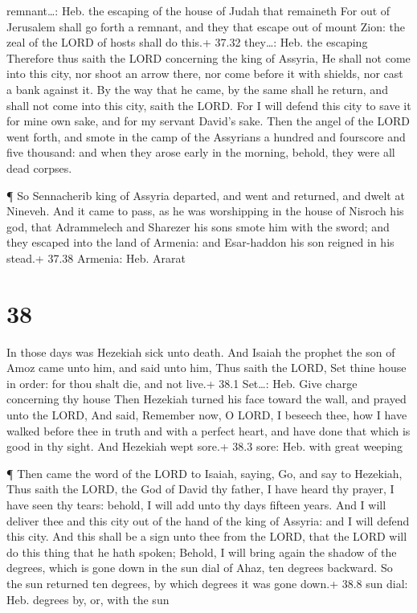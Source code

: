 remnant\ldots: Heb. the escaping of the house of Judah that remaineth
 For out of Jerusalem shall go forth a remnant, and they
that escape out of mount Zion: the zeal of the LORD of hosts shall do
this.+ 37.32 they\ldots: Heb. the escaping  Therefore thus
saith the LORD concerning the king of Assyria, He shall not come into
this city, nor shoot an arrow there, nor come before it with shields,
nor cast a bank against it.  By the way that he came, by
the same shall he return, and shall not come into this city, saith the
LORD.  For I will defend this city to save it for mine own
sake, and for my servant David's sake.  Then the angel of
the LORD went forth, and smote in the camp of the Assyrians a hundred
and fourscore and five thousand: and when they arose early in the
morning, behold, they were all dead corpses.

 ¶ So Sennacherib king of Assyria departed, and went and
returned, and dwelt at Nineveh.  And it came to pass, as he
was worshipping in the house of Nisroch his god, that Adrammelech and
Sharezer his sons smote him with the sword; and they escaped into the
land of Armenia: and Esar-haddon his son reigned in his stead.+ 37.38
Armenia: Heb. Ararat

\hypertarget{section-37}{%
\section{38}\label{section-37}}

 In those days was Hezekiah sick unto death. And Isaiah the
prophet the son of Amoz came unto him, and said unto him, Thus saith the
LORD, Set thine house in order: for thou shalt die, and not live.+ 38.1
Set\ldots: Heb. Give charge concerning thy house  Then
Hezekiah turned his face toward the wall, and prayed unto the LORD,
 And said, Remember now, O LORD, I beseech thee, how I have
walked before thee in truth and with a perfect heart, and have done that
which is good in thy sight. And Hezekiah wept sore.+ 38.3 sore: Heb.
with great weeping

 ¶ Then came the word of the LORD to Isaiah, saying,
 Go, and say to Hezekiah, Thus saith the LORD, the God of
David thy father, I have heard thy prayer, I have seen thy tears:
behold, I will add unto thy days fifteen years.  And I will
deliver thee and this city out of the hand of the king of Assyria: and I
will defend this city.  And this shall be a sign unto thee
from the LORD, that the LORD will do this thing that he hath spoken;
 Behold, I will bring again the shadow of the degrees, which
is gone down in the sun dial of Ahaz, ten degrees backward. So the sun
returned ten degrees, by which degrees it was gone down.+ 38.8 sun dial:
Heb. degrees by, or, with the sun

